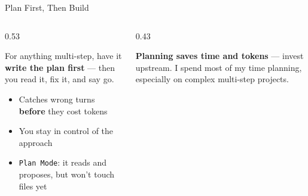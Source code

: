 \documentclass[aspectratio=169, 10pt]{beamer}
\begin{document}
\begin{frame}{Plan First, Then Build}
\vskip4pt
\begin{columns}[T]
\begin{column}{0.53\textwidth}
\begin{tcolorbox}[keybox, title={\faClipboardList\quad Ask for a plan before it acts}, top=3pt, bottom=3pt]
\small
For anything multi-step, have it \textbf{write the plan first} --- then you read it, fix it, and say go.
\vskip3pt
\begin{itemize}\setlength{\itemsep}{2pt}
  \item Catches wrong turns \textbf{before} they cost tokens
  \item You stay in control of the approach
  \item \texttt{Plan Mode}: it reads and proposes, but won't touch files yet
\end{itemize}
\end{tcolorbox}
\end{column}
\begin{column}{0.43\textwidth}
\begin{tcolorbox}[accentbox, top=3pt, bottom=3pt]
\small \textbf{Planning saves time and tokens} --- invest upstream.
\vskip3pt
I spend most of my time planning, especially on complex multi-step projects.
\end{tcolorbox}
\end{column}
\end{columns}
\end{frame}
\end{document}
